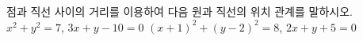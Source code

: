 점과 직선 사이의 거리를 이용하여 다음 원과 직선의 위치 관계를 말하시오.
 $x^2+y^2=7$, $3x+y-10=0$
 $(x+1)^2+(y-2)^2=8$, $2x+y+5=0$
